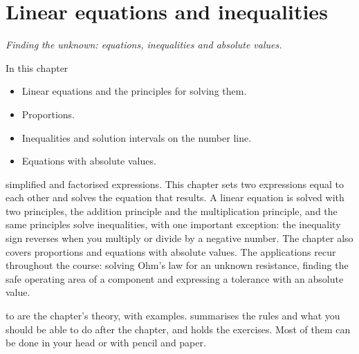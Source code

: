 
\chapter{Linear equations and inequalities}
\label{c3:ch}

{\large\itshape Finding the unknown: equations, inequalities and absolute values.\par}

\begin{chapterbox}{In this chapter}
\begin{itemize}
  \item Linear equations and the principles for solving them.
  \item Proportions.
  \item Inequalities and solution intervals on the number line.
  \item Equations with absolute values.
\end{itemize}
\end{chapterbox}

 simplified and factorised expressions. This chapter sets two expressions equal to each
other and solves the equation that results. A linear equation is solved with two principles, the
addition principle and the multiplication principle, and the same principles solve inequalities,
with one important exception: the inequality sign reverses when you multiply or divide by a
negative number. The chapter also covers proportions and equations with absolute values. The
applications recur throughout the course: solving Ohm's law for an unknown resistance, finding the
safe operating area of a component and expressing a tolerance with an absolute value.

 to  are the chapter's theory, with
examples.  summarises the rules and what you should be able to do
after the chapter, and  holds the exercises. Most of them can be done in
your head or with pencil and paper.




